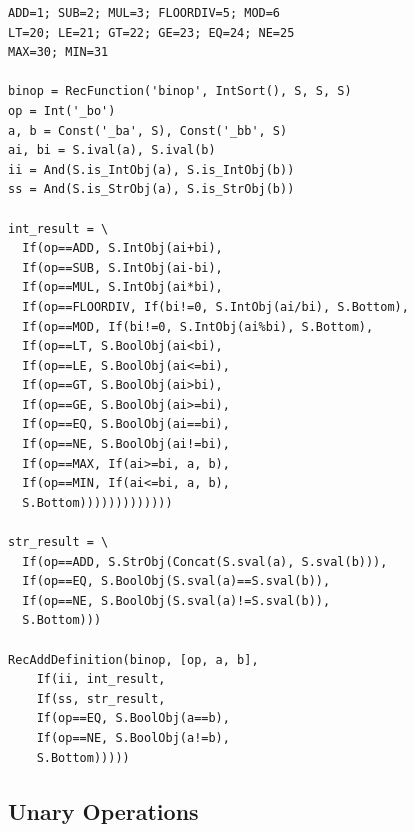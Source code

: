 \begin{lstlisting}[caption={binop: complete Z3 implementation}]
ADD=1; SUB=2; MUL=3; FLOORDIV=5; MOD=6
LT=20; LE=21; GT=22; GE=23; EQ=24; NE=25
MAX=30; MIN=31

binop = RecFunction('binop', IntSort(), S, S, S)
op = Int('_bo')
a, b = Const('_ba', S), Const('_bb', S)
ai, bi = S.ival(a), S.ival(b)
ii = And(S.is_IntObj(a), S.is_IntObj(b))
ss = And(S.is_StrObj(a), S.is_StrObj(b))

int_result = \
  If(op==ADD, S.IntObj(ai+bi),
  If(op==SUB, S.IntObj(ai-bi),
  If(op==MUL, S.IntObj(ai*bi),
  If(op==FLOORDIV, If(bi!=0, S.IntObj(ai/bi), S.Bottom),
  If(op==MOD, If(bi!=0, S.IntObj(ai%bi), S.Bottom),
  If(op==LT, S.BoolObj(ai<bi),
  If(op==LE, S.BoolObj(ai<=bi),
  If(op==GT, S.BoolObj(ai>bi),
  If(op==GE, S.BoolObj(ai>=bi),
  If(op==EQ, S.BoolObj(ai==bi),
  If(op==NE, S.BoolObj(ai!=bi),
  If(op==MAX, If(ai>=bi, a, b),
  If(op==MIN, If(ai<=bi, a, b),
  S.Bottom)))))))))))))

str_result = \
  If(op==ADD, S.StrObj(Concat(S.sval(a), S.sval(b))),
  If(op==EQ, S.BoolObj(S.sval(a)==S.sval(b)),
  If(op==NE, S.BoolObj(S.sval(a)!=S.sval(b)),
  S.Bottom)))

RecAddDefinition(binop, [op, a, b],
    If(ii, int_result,
    If(ss, str_result,
    If(op==EQ, S.BoolObj(a==b),
    If(op==NE, S.BoolObj(a!=b),
    S.Bottom)))))
\end{lstlisting}

\subsection{Unary Operations}

